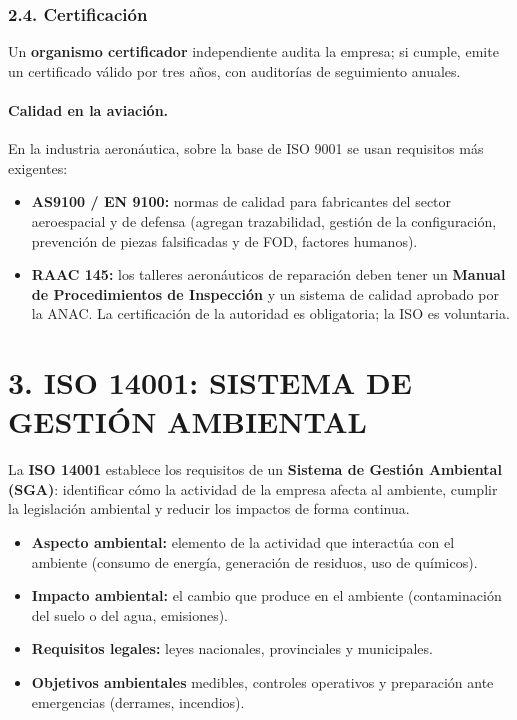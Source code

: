 \subsubsection*{2.4. Certificación}
Un \textbf{organismo certificador} independiente audita la empresa; si cumple, emite un
certificado válido por tres años, con auditorías de seguimiento anuales.

\paragraph*{Calidad en la aviación.}
En la industria aeronáutica, sobre la base de ISO 9001 se usan requisitos más exigentes:
\begin{itemize}
  \item \textbf{AS9100 / EN 9100:} normas de calidad para fabricantes del sector aeroespacial
        y de defensa (agregan trazabilidad, gestión de la configuración, prevención de piezas
        falsificadas y de FOD, factores humanos).
  \item \textbf{RAAC 145:} los talleres aeronáuticos de reparación deben tener un
        \textbf{Manual de Procedimientos de Inspección} y un sistema de calidad aprobado por la
        ANAC. La certificación de la autoridad es obligatoria; la ISO es voluntaria.
\end{itemize}

\section*{3. ISO 14001: SISTEMA DE GESTIÓN AMBIENTAL}

La \textbf{ISO 14001} establece los requisitos de un \textbf{Sistema de Gestión Ambiental
(SGA)}: identificar cómo la actividad de la empresa afecta al ambiente, cumplir la legislación
ambiental y reducir los impactos de forma continua.

\begin{itemize}
  \item \textbf{Aspecto ambiental:} elemento de la actividad que interactúa con el ambiente
        (consumo de energía, generación de residuos, uso de químicos).
  \item \textbf{Impacto ambiental:} el cambio que produce en el ambiente (contaminación del
        suelo o del agua, emisiones).
  \item \textbf{Requisitos legales:} leyes nacionales, provinciales y municipales.
  \item \textbf{Objetivos ambientales} medibles, controles operativos y preparación ante
        emergencias (derrames, incendios).
\end{itemize}


